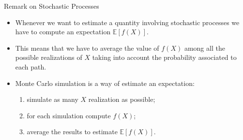 \documentclass{beamer}
\begin{document}
\begin{frame}{Remark on Stochastic Processes}
\begin{itemize}
\item Whenever we want to estimate a quantity involving stochastic processes we have to compute an expectation $\mathbb{E}[f(X)]$.
\item This means that we have to average the value of $f(X)$ among all the possible realizations of $X$ taking into account the probability associated to each path.
\item Monte Carlo simulation is a way of estimate an expectation: 
\begin{enumerate}
\item simulate as many $X$ realization as possible;
\item for each simulation compute $f(X)$;
\item average the results to estimate $\mathbb{E}[f(X)]$.
\end{enumerate}
\end{itemize}
\href{https://colab.research.google.com/drive/1cQbX7jWk4_pfrm72r3ZiZyDEpevP63z2?authuser=1\#scrollTo=1895fa54}{}
\end{frame}
\end{document}
